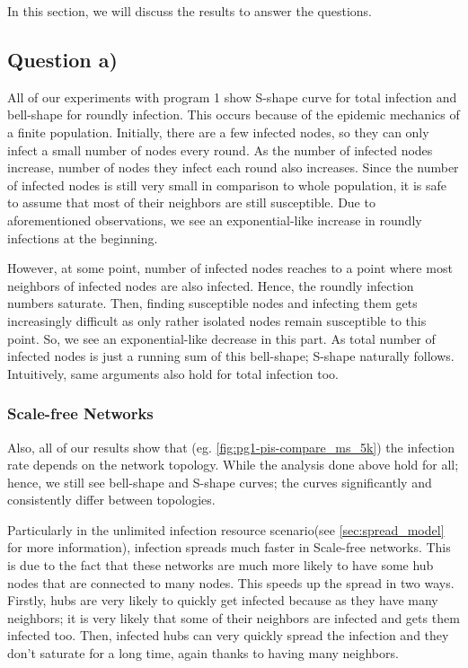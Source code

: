 \documentclass[conference]{IEEEtran}
\begin{document}
In this section, we will discuss the results to answer the questions.

\subsection{Question a)}\label{sec:question-a}

All of our experiments with program 1 show S-shape curve for total infection and bell-shape for roundly infection. This occurs because of the epidemic mechanics of a finite population. Initially, there are a few infected nodes, so they can only infect a small number of nodes every round. As the number of infected nodes increase, number of nodes they infect each round also increases. Since the number of infected nodes is still very small in comparison to whole population, it is safe to assume that most of their neighbors are still susceptible. Due to aforementioned observations, we see an exponential-like increase in roundly infections at the beginning.

However, at some point, number of infected nodes reaches to a point where most neighbors of infected nodes are also infected. Hence, the roundly infection numbers saturate. Then, finding susceptible nodes and infecting them gets increasingly difficult as only rather isolated nodes remain susceptible to this point. So, we see an exponential-like decrease in this part. As total number of infected nodes is just a running sum of this bell-shape; S-shape naturally follows. Intuitively, same arguments also hold for total infection too.

\subsubsection{Scale-free Networks}
Also, all of our results show that (eg. \autoref{fig:pg1-pis-compare_ms_5k}) the infection rate depends on the network topology. While the analysis done above hold for all; hence, we still see bell-shape and S-shape curves; the curves significantly and consistently differ between topologies.

Particularly in the unlimited infection resource scenario(see \autoref{sec:spread_model} for more information), infection spreads much faster in Scale-free networks. This is due to the fact that these networks are much more likely to have some hub nodes that are connected to many nodes. This speeds up the spread in two ways. Firstly, hubs are very likely to quickly get infected because as they have many neighbors; it is very likely that some of their neighbors are infected and gets them infected too. Then, infected hubs can very quickly spread the infection and they don't saturate for a long time, again thanks to having many neighbors.
\end{document}
